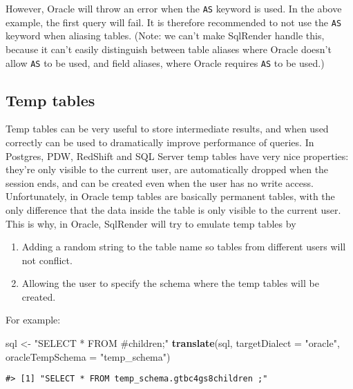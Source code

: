 \documentclass[
]{article}
\newenvironment{Shaded}{\begin{snugshade}}{\end{snugshade}}
\newcommand{\DataTypeTok}[1]{\textcolor[rgb]{0.13,0.29,0.53}{#1}}
\newcommand{\KeywordTok}[1]{\textcolor[rgb]{0.13,0.29,0.53}{\textbf{#1}}}
\newcommand{\NormalTok}[1]{#1}
\newcommand{\StringTok}[1]{\textcolor[rgb]{0.31,0.60,0.02}{#1}}
\providecommand{\tightlist}{%
  \setlength{\itemsep}{0pt}\setlength{\parskip}{0pt}}
\begin{document}
However, Oracle will throw an error when the \texttt{AS} keyword is
used. In the above example, the first query will fail. It is therefore
recommended to not use the \texttt{AS} keyword when aliasing tables.
(Note: we can't make SqlRender handle this, because it can't easily
distinguish between table aliases where Oracle doesn't allow \texttt{AS}
to be used, and field aliases, where Oracle requires \texttt{AS} to be
used.)

\hypertarget{temp-tables}{%
\subsection{Temp tables}\label{temp-tables}}

Temp tables can be very useful to store intermediate results, and when
used correctly can be used to dramatically improve performance of
queries. In Postgres, PDW, RedShift and SQL Server temp tables have very
nice properties: they're only visible to the current user, are
automatically dropped when the session ends, and can be created even
when the user has no write access. Unfortunately, in Oracle temp tables
are basically permanent tables, with the only difference that the data
inside the table is only visible to the current user. This is why, in
Oracle, SqlRender will try to emulate temp tables by

\begin{enumerate}
\def\labelenumi{\arabic{enumi}.}
\tightlist
\item
  Adding a random string to the table name so tables from different
  users will not conflict.
\item
  Allowing the user to specify the schema where the temp tables will be
  created.
\end{enumerate}

For example:

\begin{Shaded}
\begin{Highlighting}[]
\NormalTok{sql <-}\StringTok{ "SELECT * FROM #children;"}
\KeywordTok{translate}\NormalTok{(sql, }\DataTypeTok{targetDialect =} \StringTok{"oracle"}\NormalTok{, }\DataTypeTok{oracleTempSchema =} \StringTok{"temp_schema"}\NormalTok{)}
\end{Highlighting}
\end{Shaded}

\begin{verbatim}
#> [1] "SELECT * FROM temp_schema.gtbc4gs8children ;"
\end{verbatim}
\end{document}

